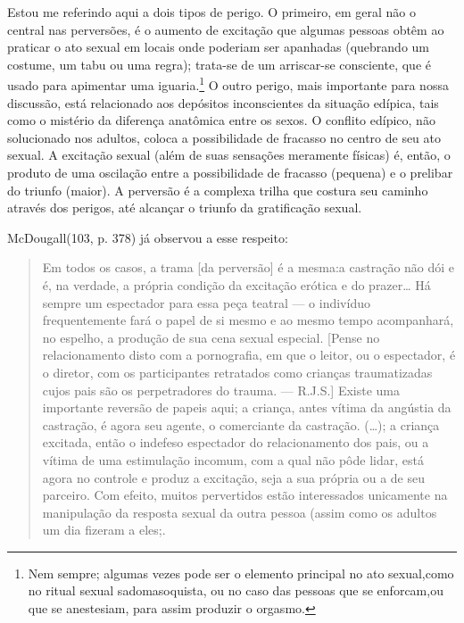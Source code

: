 Estou me referindo aqui a dois tipos de perigo. O primeiro, em
geral não o central nas perversões, é o aumento de excitação que
algumas pessoas obtêm ao praticar o ato sexual em locais onde poderiam
ser apanhadas (quebrando um costume, um tabu ou uma regra); trata-se
de um arriscar-se consciente,\idxperigocon{} que é usado para apimentar uma iguaria.\footnote{ Nem sempre;
algumas vezes pode ser o elemento principal no
ato sexual,\idxsadivoye[|nn] como no ritual sexual sadomasoquista, ou no caso das
pessoas que se enforcam,\idxenfor[|nn] ou que se anestesiam, para assim produzir o
orgasmo.} O outro perigo, mais importante para nossa discussão, está
relacionado aos depósitos inconscientes da situação edípica,\idxconfe{} tais como
o mistério da diferença anatômica entre os sexos. O conflito edípico,\idxperigocof{}
não solucionado nos adultos, coloca a possibilidade de fracasso no
centro de seu ato sexual. A excitação sexual (além de suas sensações
meramente físicas) é, então, o produto de uma oscilação entre a
possibilidade de fracasso (pequena) e o prelibar do triunfo (maior). A
perversão é a complexa trilha que costura seu caminho através dos
perigos, até alcançar o triunfo da gratificação sexual.


McDougall\idxmcdoug[|(] (103, p. 378) já observou a esse respeito:

\begin{quote}
Em todos os casos, a trama [da perversão] é a mesma:\idxsexuecas[|(]
a castração\idxcastr{} não dói e é, na verdade, a própria condição da excitação
erótica e do prazer\ldots{} Há sempre um espectador para essa peça teatral
--- o indivíduo frequentemente fará o papel de si mesmo e ao
mesmo tempo acompanhará, no espelho, a produção de sua cena sexual
especial. [Pense no relacionamento disto com a pornografia, em que o
leitor, ou o espectador, é o diretor, com os participantes retratados
como crianças traumatizadas cujos pais são os perpetradores do trauma.
--- R.J.S.] Existe uma importante reversão de papeis aqui; a
criança, antes vítima da angústia da castração, é agora seu agente, o
comerciante da castração. (\ldots{}); a criança\idxsexueinf{} excitada,\idxinfanexcit{} então o indefeso
espectador do relacionamento dos pais, ou a vítima de uma estimulação
incomum, com a qual não pôde lidar, está agora no controle e produz a
excitação, seja a sua própria ou a de seu parceiro. Com efeito, muitos
pervertidos estão interessados unicamente na manipulação da resposta
sexual da outra pessoa (assim como os adultos um dia fizeram a eles;.\idxmcdoug[|)]
\end{quote}

